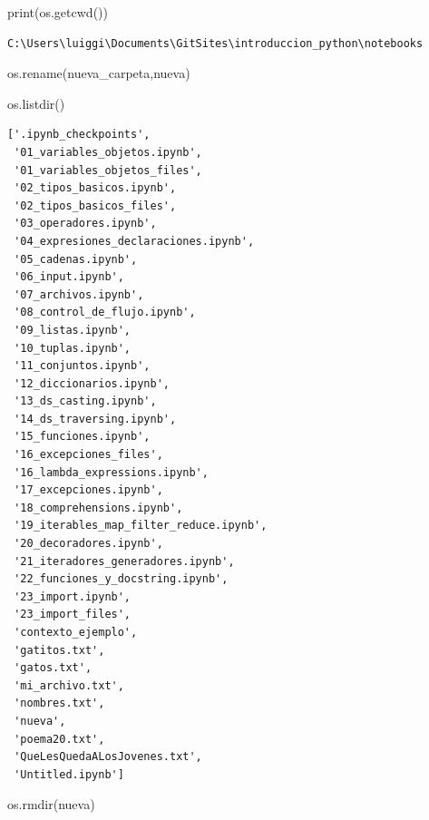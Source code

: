 \documentclass[
  spanish,
  letterpaper,
]{scrbook}
\newenvironment{Shaded}{\begin{snugshade}}{\end{snugshade}}
\newcommand{\BuiltInTok}[1]{\textcolor[rgb]{0.00,0.23,0.31}{#1}}
\newcommand{\NormalTok}[1]{\textcolor[rgb]{0.00,0.23,0.31}{#1}}
\newcommand{\StringTok}[1]{\textcolor[rgb]{0.13,0.47,0.30}{#1}}
\theoremstyle{definition}
\theoremstyle{remark}
\begin{document}
\begin{Shaded}
\begin{Highlighting}[]
\BuiltInTok{print}\NormalTok{(os.getcwd())}
\end{Highlighting}
\end{Shaded}

\begin{verbatim}
C:\Users\luiggi\Documents\GitSites\introduccion_python\notebooks
\end{verbatim}

\begin{Shaded}
\begin{Highlighting}[]
\NormalTok{os.rename(}\StringTok{\textquotesingle{}nueva\_carpeta\textquotesingle{}}\NormalTok{,}\StringTok{\textquotesingle{}nueva\textquotesingle{}}\NormalTok{)}
\end{Highlighting}
\end{Shaded}

\begin{Shaded}
\begin{Highlighting}[]
\NormalTok{os.listdir()}
\end{Highlighting}
\end{Shaded}

\begin{verbatim}
['.ipynb_checkpoints',
 '01_variables_objetos.ipynb',
 '01_variables_objetos_files',
 '02_tipos_basicos.ipynb',
 '02_tipos_basicos_files',
 '03_operadores.ipynb',
 '04_expresiones_declaraciones.ipynb',
 '05_cadenas.ipynb',
 '06_input.ipynb',
 '07_archivos.ipynb',
 '08_control_de_flujo.ipynb',
 '09_listas.ipynb',
 '10_tuplas.ipynb',
 '11_conjuntos.ipynb',
 '12_diccionarios.ipynb',
 '13_ds_casting.ipynb',
 '14_ds_traversing.ipynb',
 '15_funciones.ipynb',
 '16_excepciones_files',
 '16_lambda_expressions.ipynb',
 '17_excepciones.ipynb',
 '18_comprehensions.ipynb',
 '19_iterables_map_filter_reduce.ipynb',
 '20_decoradores.ipynb',
 '21_iteradores_generadores.ipynb',
 '22_funciones_y_docstring.ipynb',
 '23_import.ipynb',
 '23_import_files',
 'contexto_ejemplo',
 'gatitos.txt',
 'gatos.txt',
 'mi_archivo.txt',
 'nombres.txt',
 'nueva',
 'poema20.txt',
 'QueLesQuedaALosJovenes.txt',
 'Untitled.ipynb']
\end{verbatim}

\begin{Shaded}
\begin{Highlighting}[]
\NormalTok{os.rmdir(}\StringTok{\textquotesingle{}nueva\textquotesingle{}}\NormalTok{)}
\end{Highlighting}
\end{Shaded}
\end{document}
